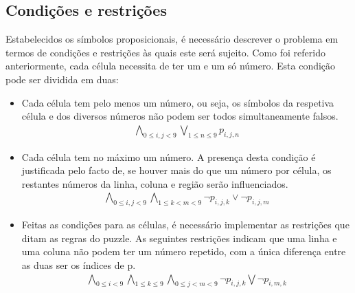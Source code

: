 \documentclass[a4paper,12pt]{article}
\begin{document}
\subsection{Condições e restrições}
Estabelecidos os símbolos proposicionais, é necessário descrever o problema em
termos de condições e restrições às quais este será sujeito.  Como foi referido
anteriormente, cada célula necessita de ter um e um só número. Esta condição
pode ser dividida em duas:
\begin{itemize}
     \item Cada célula tem pelo menos um número, ou seja, os símbolos da
        respetiva célula e dos diversos números não podem ser todos
        simultaneamente falsos.
        \begin{align}
        \bigwedge_{0\leq i,j < 9}
           \bigvee_{1\leq n \leq 9} p_{i,j,n}
        \end{align}
     
      \item Cada célula tem no máximo um número. A presença desta condição é
        justificada pelo facto de, se houver mais do que um número por célula,
        os restantes números da linha, coluna e região serão influenciados.
        \begin{align}
        \bigwedge_{0\leq i,j < 9}
           \bigwedge_{1\leq k < m < 9}
           {\lnot p_{i,j,k} \lor \lnot p_{i,j,m}}
        \end{align}

      \item Feitas as condições para as células, é necessário implementar as
         restrições que ditam as regras do puzzle.  As seguintes restrições
         indicam que uma linha e uma coluna não podem ter um número repetido,
         com a única diferença entre as duas ser os índices de p.
         \begin{align}
         \bigwedge_{0\leq i < 9} \bigwedge_{1\leq k \leq 9} \bigwedge_{0\leq j < m
         < 9} \lnot p_{i,j,k}
         \bigvee \lnot p_{i,m,k}
         \end{align}


\end{itemize}
\end{document}
